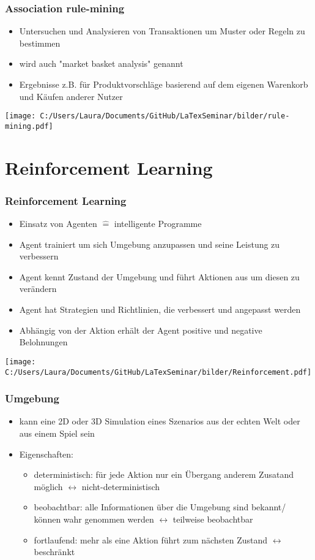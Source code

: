 \documentclass[11pt]{beamer}
\begin{document}
	\begin{frame}
		\frametitle{ Association rule-mining}
		\begin{itemize}
			\item Untersuchen und Analysieren von Transaktionen um Muster oder Regeln zu bestimmen
			\item wird auch "market basket analysis" genannt
			\item Ergebnisse z.B. für Produktvorschläge basierend auf dem eigenen Warenkorb und Käufen anderer Nutzer 
		\end{itemize} 
		\texttt{[image: C:/Users/Laura/Documents/GitHub/LaTexSeminar/bilder/rule-mining.pdf]}
	\end{frame}
	
	\section{Reinforcement Learning}
	
	\begin{frame}
		\frametitle{Reinforcement Learning}
		\begin{itemize}
			\item Einsatz von Agenten $\widehat{=}$ intelligente Programme
			\item Agent trainiert um sich Umgebung anzupassen und seine Leistung zu verbessern
			\item Agent kennt Zustand der Umgebung und führt Aktionen aus um diesen zu verändern
			\item Agent hat Strategien und Richtlinien, die verbessert und angepasst werden
			\item Abhängig von der Aktion erhält der Agent positive und negative Belohnungen
		\end{itemize}
		\centering
		\texttt{[image: C:/Users/Laura/Documents/GitHub/LaTexSeminar/bilder/Reinforcement.pdf]}
	\end{frame}
	
	\begin{frame}
		\frametitle{Umgebung}
		\begin{itemize}
			\item kann eine 2D oder 3D Simulation eines Szenarios aus der echten Welt oder aus einem Spiel sein
			\item Eigenschaften:
			\begin{itemize}
				\item deterministisch: für jede Aktion nur ein Übergang anderem Zusatand möglich $\leftrightarrow$ nicht-deterministisch
				\item beobachtbar: alle Informationen über die Umgebung sind bekannt/ können wahr genommen werden $\leftrightarrow$ teilweise beobachtbar %
				\item fortlaufend: mehr als eine Aktion führt zum nächsten Zustand $\leftrightarrow$ beschränkt
			\end{itemize}
		\end{itemize}
	\end{frame}
	
\end{document}
